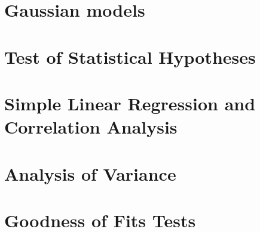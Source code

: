 \documentclass[a4paper, 10pt]{scrbook}  %
\begin{document}
\chapter{Gaussian models}

\chapter{Test of Statistical Hypotheses}

\chapter{Simple Linear Regression and Correlation Analysis}

\chapter{Analysis of Variance}

\chapter{Goodness of Fits Tests}

\end{document}
